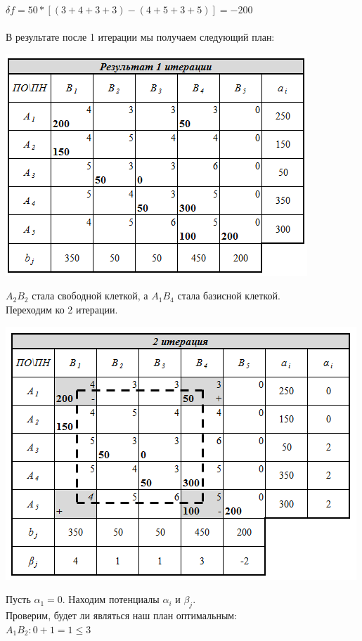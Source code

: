 \documentclass[14pt,a4paper,fleqn]{extarticle}
\begin{document}
$\delta f = 50*[(3+4+3+3)-(4+5+3+5)] = -200$\\\\
В результате после 1 итерации мы получаем следующий план:
\begin{center}
	\includegraphics[scale=0.5]{37}
\end{center}
$A_2B_2$ стала свободной клеткой, а $A_1B_4$ стала базисной клеткой.\\
Переходим ко 2 итерации.\\
\begin{center}
	\includegraphics[scale=0.5]{38}
\end{center}
\newpage
Пусть $\alpha_1 = 0$. Находим потенциалы $\alpha_i$ и $\beta_j$.\\
Проверим, будет ли являться наш план оптимальным:\\
$A_1B_2: 0 + 1 = 1 \leq 3$\\
\end{document}

